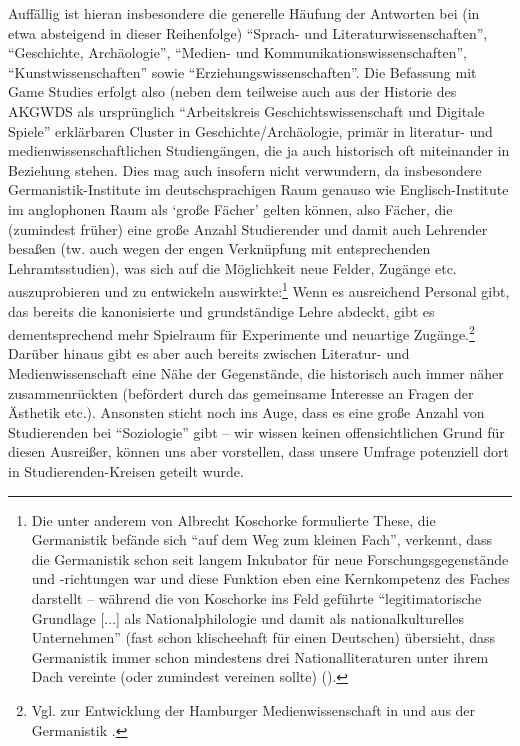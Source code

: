 \documentclass{scrartcl}
\begin{document}
Auffällig ist hieran insbesondere die generelle Häufung der Antworten bei (in etwa absteigend in dieser Reihenfolge) \enquote{Sprach- und Literaturwissenschaften}, \enquote{Geschichte, Archäologie}, \enquote{Medien- und Kommunikationswissenschaften}, \enquote{Kunstwissenschaften} sowie \enquote{Erziehungswissenschaften}.
Die Befassung mit Game Studies erfolgt also (neben dem teilweise auch aus der Historie des AKGWDS als ursprünglich \enquote{Arbeitskreis Geschichtswissenschaft und Digitale Spiele} erklärbaren Cluster in Geschichte/Archäologie, primär in literatur- und medienwissenschaftlichen Studiengängen, die ja auch historisch oft miteinander in Beziehung stehen.
Dies mag auch insofern nicht verwundern, da insbesondere Germanistik-Institute im deutschsprachigen Raum genauso wie Englisch-Institute im anglophonen Raum als \enquote*{große Fächer} gelten können, also Fächer, die (zumindest früher) eine große Anzahl Studierender und damit auch Lehrender besaßen (tw. auch wegen der engen Verknüpfung mit entsprechenden Lehramtsstudien), was sich auf die Möglichkeit neue Felder, Zugänge etc. auszuprobieren und zu entwickeln auswirkte:\footnote{Die unter anderem von Albrecht Koschorke formulierte These, die Germanistik befände sich \enquote{auf dem Weg zum kleinen Fach}, verkennt, dass die Germanistik schon seit langem Inkubator für neue Forschungsgegenstände und -richtungen war und diese Funktion eben eine Kernkompetenz des Faches darstellt -- während die von Koschorke ins Feld geführte \enquote{legitimatorische Grundlage [$\ldots$] als Nationalphilologie und damit als nationalkulturelles Unternehmen} (fast schon klischeehaft für einen Deutschen) übersieht, dass Germanistik immer schon mindestens drei Nationalliteraturen unter ihrem Dach vereinte (oder zumindest vereinen sollte) (\autocite[vgl.][S.~590]{koschorke_germanistik_2015}).}
Wenn es ausreichend Personal gibt, das bereits die kanonisierte und grundständige Lehre abdeckt, gibt es dementsprechend mehr Spielraum für Experimente und neuartige Zugänge.\footnote{Vgl. zur Entwicklung der Hamburger Medienwissenschaft in und aus der Germanistik \autocite[][S.~35–56]{hickethier_binnendifferenzierung_2000}.}
Darüber hinaus gibt es aber auch bereits zwischen Literatur- und Medienwissenschaft eine Nähe der Gegenstände, die historisch auch immer näher zusammenrückten (befördert durch das gemeinsame Interesse an Fragen der Ästhetik etc.).
Ansonsten sticht noch ins Auge, dass es eine große Anzahl von Studierenden bei \enquote{Soziologie} gibt -- wir wissen keinen offensichtlichen Grund für diesen Ausreißer, können uns aber vorstellen, dass unsere Umfrage potenziell dort in Studierenden-Kreisen geteilt wurde.
\end{document}
